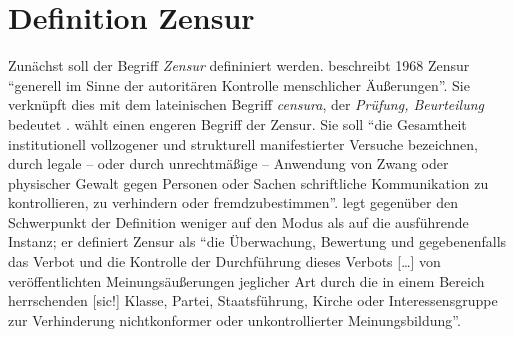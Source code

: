 \section{Definition Zensur} \label{definition_zensur}
Zunächst soll der Begriff \textit{Zensur} defininiert werden. \citeauthor{Otto1968} beschreibt 1968 Zensur \enquote{generell im Sinne der autoritären Kontrolle menschlicher Äußerungen}\autocite[3]{Otto1968}. Sie verknüpft dies mit dem lateinischen Begriff \textit{censura}, der \textit{Prüfung, Beurteilung} bedeutet \autocite[Vgl.][3]{Otto1968}.  \citeauthor{Biermann1988} wählt einen engeren Begriff der Zensur. Sie soll \enquote{die Gesamtheit institutionell vollzogener und strukturell manifestierter Versuche bezeichnen, durch legale -- oder durch unrechtmäßige -- Anwendung  von Zwang oder physischer Gewalt gegen Personen oder Sachen schriftliche Kommunikation zu kontrollieren, zu verhindern oder fremdzubestimmen}\autocite[3]{Biermann1988}. \citeauthor{Zelger1999} legt gegenüber \citeauthor{Biermann1988} den Schwerpunkt der Definition weniger auf den Modus als auf die ausführende Instanz; er definiert Zensur als \enquote{die Überwachung, Bewertung und gegebenenfalls das Verbot und die Kontrolle der Durchführung dieses Verbots [\ldots] von veröffentlichten Meinungsäußerungen jeglicher Art durch die in einem Bereich herrschenden [sic!] Klasse, Partei, Staatsführung, Kirche oder Interessensgruppe zur Verhinderung nichtkonformer oder unkontrollierter Meinungsbildung}\autocite[10\psq]{Zelger1999}.

